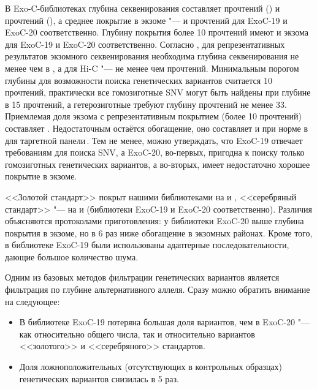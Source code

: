\documentclass[a4paper,14pt]{extarticle}
\newcommand{\mln}{млн}
\newcommand{\ecitep}[1]{\textenglish{\citep{#1}}}
\begin{document}
В Exo-C\hyp{}библиотеках глубина секвенирования составляет \numprint[\mln]{136.6} прочтений () и \numprint[\mln]{109.4} прочтений (), а среднее покрытие в экзоме "---  и  прочтений для ExoC-19 и ExoC-20 соответственно.
Глубину покрытия более 10 прочтений имеют  и  экзома для ExoC-19 и ExoC-20 соответственно.
Согласно \citet{Sims_2014}, для репрезентативных результатов экзомного секвенирования необходима глубина секвенирования не менее чем в , а для Hi-C "--- не менее чем \numprint[\mln]{100} прочтений.
Минимальным порогом глубины для возможности поиска генетических вариантов считается 10 прочтений, практически все гомозиготные SNV могут быть найдены при глубине в 15 прочтений, а гетерозиготные требуют глубину прочтений не менее 33.
Приемлемая доля экзома с репрезентативным покрытием (более 10 прочтений) составляет .
Недостаточным остаётся обогащение, оно составляет  и  при норме в  для  таргетной панели\,\ecitep{Roche_SeqCap}.
Тем не менее, можно утверждать, что ExoC-19 отвечает требованиям для поиска SNV, а ExoC-20, во-первых, пригодна к поиску только гомозиготных генетических вариантов, а во-вторых, имеет недостаточно хорошее покрытие в экзоме.

<<Золотой стандарт>> покрыт нашими библиотеками на  и , <<серебряный стандарт>> "--- на  и  (библиотеки ExoC-19 и ExoC-20 соответственно).
Различия объясняются протоколами приготовления: у библиотеки ExoC-20 выше глубина покрытия в экзоме, но в 6 раз ниже обогащение в экзомных районах.
Кроме того, в библиотеке ExoC-19 были использованы адаптерные последовательности, дающие большое количество шума.

Одним из базовых методов фильтрации генетических вариантов является фильтрация по глубине альтернативного аллеля.
Сразу можно обратить внимание на следующее:

\begin{itemize}
	\item В библиотеке ExoC-19 потеряна большая доля вариантов, чем в ExoC-20 "--- как относительно общего числа, так и относительно вариантов <<золотого>> и <<серебряного>> стандартов.
	\item Доля ложноположительных (отсутствующих в контрольных образцах) генетических вариантов снизилась в 5 раз.
\end{itemize}
\end{document}
